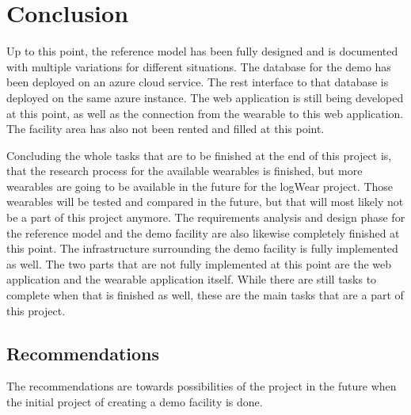 \chapter{Conclusion}\label{cha:conclusion}
Up to this point, the reference model has been fully designed and is documented with multiple variations for different situations. The database for the demo has been deployed on an azure cloud service. The \gls{rest} interface to that database is deployed on the same azure instance. The web application is still being developed at this point, as well as the connection from the wearable to this web application. The facility area has also not been rented and filled at this point. 

Concluding the whole tasks that are to be finished at the end of this project is, that the research process for the available wearables is finished, but more wearables are going to be available in the future for the logWear project. Those wearables will be tested and compared in the future, but that will most likely not be a part of this project anymore. The requirements analysis and design phase for the reference model and the demo facility are also likewise completely finished at this point. The infrastructure surrounding the demo facility is fully implemented as well. The two parts that are not fully implemented at this point are the web application and the wearable application itself. While there are still tasks to complete when that is finished as well, these are the main tasks that are a part of this project.





\section{Recommendations}\label{sec:recommendations}
The recommendations are towards possibilities of the project in the future when the initial project of creating a demo facility is done.

